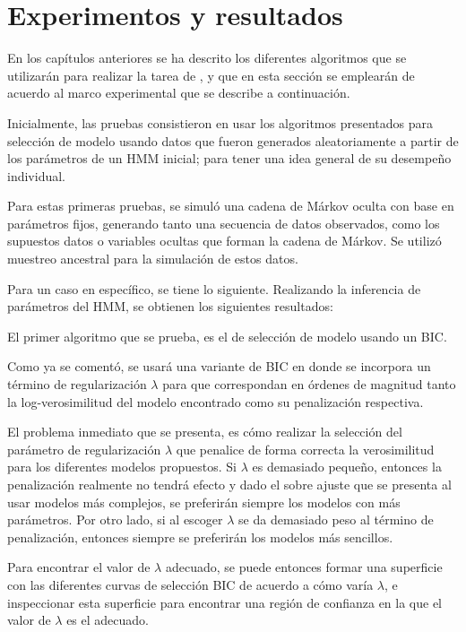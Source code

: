 
\chapter{Experimentos y resultados}\label{ch:chap5}

En los capítulos anteriores se ha descrito los diferentes algoritmos que se utilizarán para realizar la tarea de \sd, y que en esta sección se emplearán de acuerdo al marco experimental que se describe a continuación.

Inicialmente, las pruebas consistieron en usar los algoritmos presentados para selección de modelo usando datos que fueron generados aleatoriamente a partir de los parámetros de un HMM inicial; para tener una idea general de su desempeño individual.

Para estas primeras pruebas, se simuló una cadena de Márkov oculta con base en parámetros fijos, generando tanto una secuencia de datos observados, como los supuestos datos o variables ocultas que forman la cadena de Márkov. Se utilizó muestreo ancestral para la simulación de estos datos.

Para un caso en específico, se tiene lo siguiente. Realizando la inferencia de parámetros del HMM, se obtienen los siguientes resultados:

El primer algoritmo que se prueba, es el de selección de modelo usando un BIC.

Como ya se comentó, se usará una variante de BIC en donde se incorpora un término de regularización $\lambda$ para que correspondan en órdenes de magnitud tanto la log-verosimilitud del modelo encontrado como su penalización respectiva.

El problema inmediato que se presenta, es cómo realizar la selección del parámetro de regularización $\lambda$ que penalice de forma correcta la verosimilitud para los diferentes modelos propuestos. Si $\lambda$ es demasiado pequeño, entonces la penalización realmente no tendrá efecto y dado el sobre ajuste que se presenta al usar modelos más complejos, se preferirán siempre los modelos con más parámetros. Por otro lado, si al escoger $\lambda$ se da demasiado peso al término de penalización, entonces siempre se preferirán los modelos más sencillos.

Para encontrar el valor de $\lambda$ adecuado, se puede entonces formar una superficie con las diferentes curvas de selección BIC de acuerdo a cómo varía $\lambda$, e inspeccionar esta superficie para encontrar una región de confianza en la que el valor de $\lambda$ es el adecuado.

